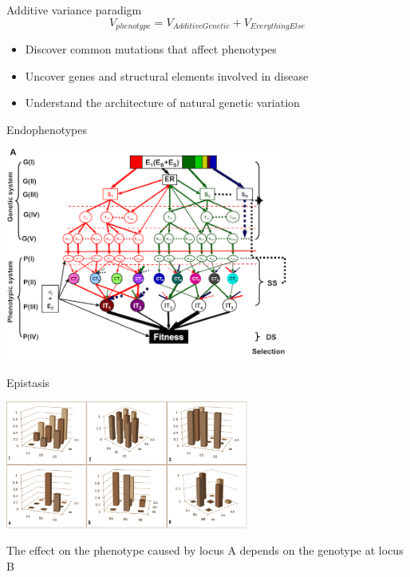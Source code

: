 \documentclass{beamer}
\begin{document}
\begin{frame}{Additive variance paradigm}
	\begin{equation}
		V_{phenotype} = V_{{Additive} {Genetic}} + V_{{Everything} {Else}} \nonumber
	\end{equation}
	\begin{itemize}
		\item Discover common mutations that affect phenotypes
		\item Uncover genes and structural elements involved in disease
		\item Understand the architecture of natural genetic variation
	\end{itemize}
\end{frame}


\begin{frame}{Endophenotypes}
	\begin{center}
		\includegraphics[height=7cm]{broadgp.png}
	\end{center}
\end{frame}

\begin{frame}{Epistasis}
	\begin{center}
		\includegraphics[width=8cm]{gpmaps2.pdf}
	\end{center}
	\begin{definition}
		The effect on the phenotype caused by locus A depends on the genotype at locus B
	\end{definition}
\end{frame}
\end{document}
